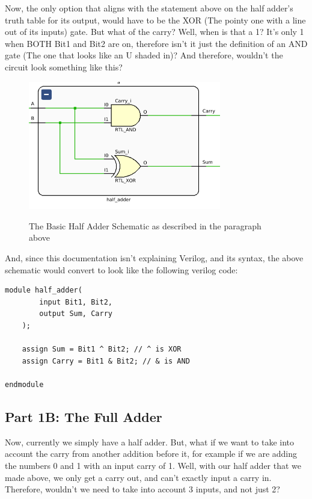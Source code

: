 \documentclass{article}
\begin{document}
Now, the only option that aligns with the statement above on the half adder's truth table for its output, would have to be the XOR (The pointy one with a line out of its inputs) gate. But what of the carry? Well, when is that a 1? It's only 1 when BOTH Bit1 and Bit2 are on, therefore isn't it just the definition of an AND gate (The one that looks like an U shaded in)? And therefore, wouldn't the circuit look something like this?
\begin{figure}[!htbp]
    \centering
    \caption{The Basic Half Adder Schematic as described in the paragraph above}
    \includegraphics[width=0.75\textwidth]{pictures/part1/basic_half_adder.png}
    \label{Basic 2-Bit Adder}
\end{figure}
\newline
And, since this documentation isn't explaining Verilog, and its syntax, the above schematic would convert to look like the following verilog code:
\begin{lstlisting}[caption={Half Adder with 2 input bits, and outputs, sum and carry, as explained}, label={Half Adder Verilog}, style=Verilog]
module half_adder(
        input Bit1, Bit2,
        output Sum, Carry
    );
    
    assign Sum = Bit1 ^ Bit2; // ^ is XOR
    assign Carry = Bit1 & Bit2; // & is AND
    
endmodule
\end{lstlisting}


\subsection{Part 1B: The Full Adder}
\qquad
Now, currently we simply have a half adder. But, what if we want to take into account the carry from another addition before it, for example if we are adding the numbers 0 and 1 with an input carry of 1. Well, with our half adder that we made above, we only get a carry out, and can't exactly input a carry in. Therefore, wouldn't we need to take into account 3 inputs, and not just 2?
\end{document}
